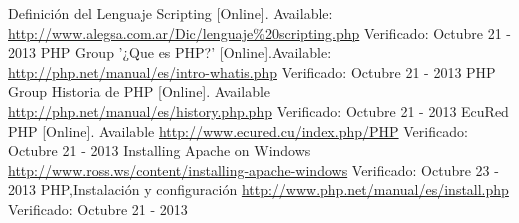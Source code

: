 \documentclass[11pt]{article} %
\begin{document}
\begin{thebibliography}{99}

\bibitem{[1]}   Definición del Lenguaje Scripting [Online]. Available: \url{http://www.alegsa.com.ar/Dic/lenguaje%20scripting.php} Verificado: Octubre 21 - 2013
\bibitem{[2]}   PHP Group  '¿Que es PHP?' [Online].Available: \url{http://php.net/manual/es/intro-whatis.php}  Verificado: Octubre 21 - 2013
\bibitem{[3]}   PHP Group  Historia de PHP [Online]. Available \url{http://php.net/manual/es/history.php.php}  Verificado: Octubre 21 - 2013
\bibitem{[4]}   EcuRed  PHP [Online]. Available \url{http://www.ecured.cu/index.php/PHP}  Verificado: Octubre 21 - 2013
\bibitem{[5]}  Installing Apache on Windows \url{http://www.ross.ws/content/installing-apache-windows}  Verificado: Octubre 23 - 2013
\bibitem{[6]}  PHP,Instalación y configuración \url{http://www.php.net/manual/es/install.php}  Verificado: Octubre 21 - 2013

\end{thebibliography}
\end{document}
